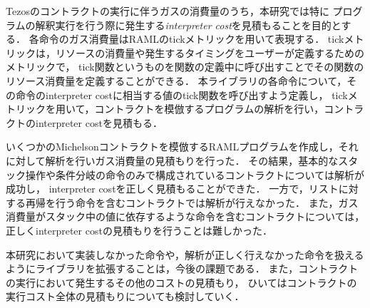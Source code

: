 \documentclass{kuisthesis}
\begin{document}
\begin{jabstract}
Tezosのコントラクトの実行に伴うガスの消費量のうち，本研究では特に
プログラムの解釈実行を行う際に発生する\emph{interpreter cost}を見積もることを目的とする．
各命令のガス消費量はRAMLのtickメトリックを用いて表現する．
tickメトリックは，リソースの消費量や発生するタイミングをユーザーが定義するためのメトリックで，
tick関数というものを関数の定義中に呼び出すことでその関数のリソース消費量を定義することができる．
本ライブラリの各命令について，その命令のinterpreter costに相当する値のtick関数を呼び出すよう定義し，
tickメトリックを用いて，コントラクトを模倣するプログラムの解析を行い，コントラクトのinterpreter costを見積もる．

いくつかのMichelsonコントラクトを模倣するRAMLプログラムを作成し，それに対して解析を行いガス消費量の見積もりを行った．
その結果，基本的なスタック操作や条件分岐の命令のみで構成されているコントラクトについては解析が成功し，
interpreter costを正しく見積もることができた．
一方で，リストに対する再帰を行う命令を含むコントラクトでは解析が行えなかった．
また，ガス消費量がスタック中の値に依存するような命令を含むコントラクトについては，
正しくinterpreter costの見積もりを行うことは難しかった．

本研究において実装しなかった命令や，解析が正しく行えなかった命令を扱えるようにライブラリを拡張することは，今後の課題である．
また，コントラクトの実行において発生するその他のコストの見積もり，
ひいてはコントラクトの実行コスト全体の見積もりについても検討していく．


\end{jabstract}
\end{document}
